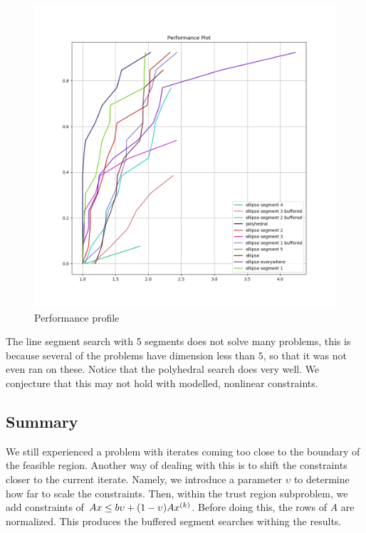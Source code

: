 \begin{figure}[h]
    \centering
    \includegraphics[scale=0.4]{images/performance_profile_plot.png}
    \caption{Performance profile}
    \label{performance_profile}
\end{figure}



The line segment search with 5 segments does not solve many problems, this is because several of the problems have dimension less than $5$, so that it was not even ran on these.
Notice that the polyhedral search does very well.
We conjecture that this may not hold with modelled, nonlinear constraints.




\subsection{Summary}
We still experienced a problem with iterates coming too close to the boundary of the feasible region.
Another way of dealing with this is to shift the constraints closer to the current iterate.
Namely, we introduce a parameter $\upsilon$ to determine how far to scale the constraints.
Then, within the trust region subproblem, we add constraints of $Ax \le b\upsilon + (1-\upsilon) A{x}^{(k)}$.
Before doing this, the rows of $A$ are normalized.
This produces the buffered segment searches withing the results.

